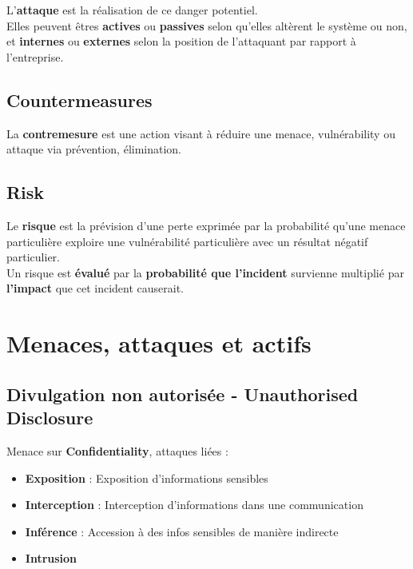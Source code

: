 \documentclass{report}
\begin{document}
			L'\textbf{attaque} est la réalisation de ce danger potentiel.\\
			Elles peuvent êtres \textbf{actives} ou \textbf{passives} selon qu'elles altèrent le système ou non, et \textbf{internes} ou \textbf{externes} selon la position de l'attaquant par rapport à l'entreprise.\\

		\subsection{Countermeasures}

			La \textbf{contremesure} est une action visant à réduire une menace, vulnérability ou attaque via prévention, élimination.\\

		\subsection{Risk}

			Le \textbf{risque} est la prévision d'une perte exprimée par la probabilité qu'une menace particulière exploire une vulnérabilité particulière avec un résultat négatif particulier.\\

			Un risque est \textbf{évalué} par la \textbf{probabilité que l'incident} survienne multiplié par \textbf{l'impact} que cet incident causerait.\\

	\section{Menaces, attaques et actifs}

		\subsection{Divulgation non autorisée - Unauthorised Disclosure}

			Menace sur \textbf{Confidentiality}, attaques liées : \\

			\begin{itemize}
				\item \textbf{Exposition} : Exposition d'informations sensibles
				\item \textbf{Interception} : Interception d'informations dans une communication
				\item \textbf{Inférence} : Accession à des infos sensibles de manière indirecte
				\item \textbf{Intrusion}\\
			\end{itemize}
\end{document}
